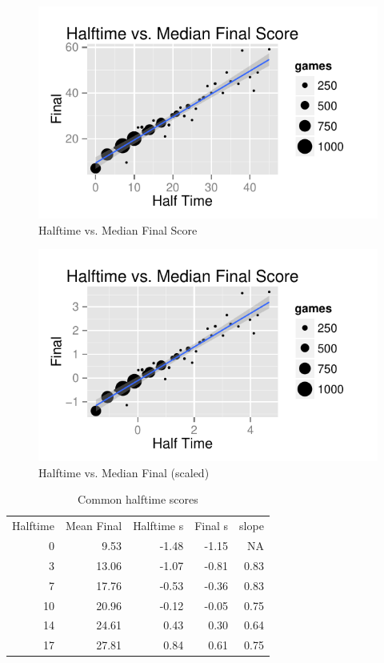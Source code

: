 \documentclass[landscape]{exam}
\begin{document}
  \begin{figure}[H]
    \centering
    \includegraphics{figures/nfl/ht_vs_median_final.pdf}
    \caption{Halftime vs. Median Final Score}
  \end{figure}

  \begin{figure}[H]
    \centering
    \includegraphics{figures/nfl/ht_vs_median_final_scaled.pdf}
    \caption{Halftime vs. Median Final (scaled)}
  \end{figure}

  \begin{table}[H]
    \centering
    \begin{tabular}{rrrrr}
      \toprule
      \midrule
      Halftime & Mean Final & Halftime s & Final s & slope\\
      0        & 9.53       & -1.48      & -1.15   & NA \\
      3        & 13.06      & -1.07      & -0.81   & 0.83 \\
      7        & 17.76      & -0.53      & -0.36   & 0.83 \\
      10       & 20.96      & -0.12      & -0.05   & 0.75 \\
      14       & 24.61      & 0.43       & 0.30    & 0.64 \\
      17       & 27.81      & 0.84       & 0.61    & 0.75 \\
      \bottomrule
    \end{tabular}
    \caption{Common halftime scores}
  \end{table}

\end{document}
